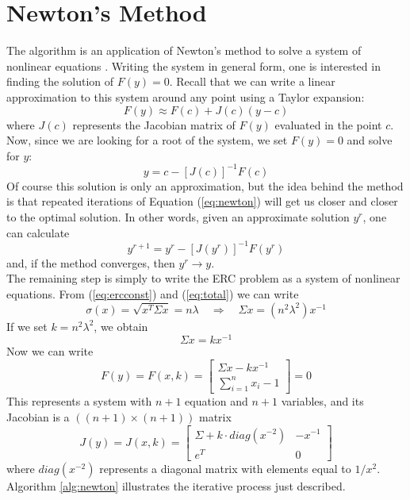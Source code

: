 \section{Newton's Method}
The algorithm is an application of Newton’s method to solve a system of nonlinear equations \cite{newton}. Writing the system in general form, one is interested in finding the solution of $F(y)=0$. Recall that we can write a linear approximation to this system around any point using a Taylor expansion:
\begin{equation}
F(y) \approx F(c) + J(c)(y-c)
\end{equation}
where $J(c)$ represents the Jacobian matrix of $F(y)$ evaluated in the point $c$. Now, since we are looking for a root of the system, we set $F(y) = 0$ and solve for $y$:
\begin{equation}\label{eq:newton}
y = c - [J(c)]^{-1}F(c)
\end{equation}
Of course this solution is only an approximation, but the idea behind the method is that repeated iterations of Equation (\ref{eq:newton}) will get us closer and closer to the optimal solution. In other words, given an approximate solution $y^{r}$, one can calculate
\begin{equation}
y^{r+1} = y^{r} - [J(y^{r})]^{-1}F(y^{r})
\end{equation}
and, if the method converges, then $y^{r}\rightarrow y$.\\
The remaining step is simply to write the ERC problem as a system of nonlinear equations. From (\ref{eq:ercconst}) and (\ref{eq:total}) we can write
\begin{equation}
\sigma(x) = \sqrt{x^T \Sigma x} = n\lambda \hspace{1em} \Rightarrow \hspace{1em} \Sigma x = (n^2\lambda^2)x^{-1}
\end{equation}
If we set $k=n^2\lambda^2$, we obtain
\begin{equation}
\Sigma x = k x^{-1}
\end{equation}
Now we can write
\begin{equation}
F(y) = F(x, k)= \begin{bmatrix}
    \Sigma x - kx^{-1}\\
    \sum_{i=1}^n x_i - 1
\end{bmatrix} = 0
\end{equation}
This represents a system with $n+1$ equation and $n+1$ variables, and its Jacobian is a $((n+1)\times(n+1))$ matrix
\begin{equation}
J(y) = J(x,k) = \begin{bmatrix}
    \Sigma + k\cdot diag(x^{-2}) & -x^{-1}\\
    e^T & 0
\end{bmatrix}
\end{equation}
where $diag(x^{-2})$ represents a diagonal matrix with elements equal to $1/x^2$. Algorithm \ref{alg:newton} illustrates the iterative process just described.

